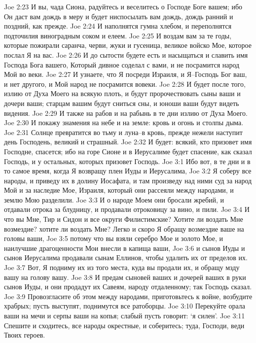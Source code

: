 Joe 2:23  И вы, чада Сиона, радуйтесь и веселитесь о Господе Боге вашем; ибо Он даст вам дождь в меру и будет ниспосылать вам дождь, дождь ранний и поздний, как прежде.
Joe 2:24  И наполнятся гумна хлебом, и переполнятся подточилия виноградным соком и елеем.
Joe 2:25  И воздам вам за те годы, которые пожирали саранча, черви, жуки и гусеница, великое войско Мое, которое послал Я на вас.
Joe 2:26  И до сытости будете есть и насыщаться и славить имя Господа Бога вашего, Который дивное соделал с вами, и не посрамится народ Мой во веки.
Joe 2:27  И узнаете, что Я посреди Израиля, и Я--Господь Бог ваш, и нет другого, и Мой народ не посрамится вовеки.
Joe 2:28  И будет после того, излию от Духа Моего на всякую плоть, и будут пророчествовать сыны ваши и дочери ваши; старцам вашим будут сниться сны, и юноши ваши будут видеть видения.
Joe 2:29  И также на рабов и на рабынь в те дни излию от Духа Моего.
Joe 2:30  И покажу знамения на небе и на земле: кровь и огонь и столпы дыма.
Joe 2:31  Солнце превратится во тьму и луна--в кровь, прежде нежели наступит день Господень, великий и страшный.
Joe 2:32  И будет: всякий, кто призовет имя Господне, спасется; ибо на горе Сионе и в Иерусалиме будет спасение, как сказал Господь, и у остальных, которых призовет Господь.
Joe 3:1  Ибо вот, в те дни и в то самое время, когда Я возвращу плен Иуды и Иерусалима,
Joe 3:2  Я соберу все народы, и приведу их в долину Иосафата, и там произведу над ними суд за народ Мой и за наследие Мое, Израиля, который они рассеяли между народами, и землю Мою разделили.
Joe 3:3  И о народе Моем они бросали жребий, и отдавали отрока за блудницу, и продавали отроковицу за вино, и пили.
Joe 3:4  И что вы Мне, Тир и Сидон и все округи Филистимские? Хотите ли воздать Мне возмездие? хотите ли воздать Мне? Легко и скоро Я обращу возмездие ваше на головы ваши,
Joe 3:5  потому что вы взяли серебро Мое и золото Мое, и наилучшие драгоценности Мои внесли в капища ваши,
Joe 3:6  и сынов Иуды и сынов Иерусалима продавали сынам Еллинов, чтобы удалить их от пределов их.
Joe 3:7  Вот, Я подниму их из того места, куда вы продали их, и обращу мзду вашу на голову вашу.
Joe 3:8  И предам сыновей ваших и дочерей ваших в руки сынов Иуды, и они продадут их Савеям, народу отдаленному; так Господь сказал.
Joe 3:9  Провозгласите об этом между народами, приготовьтесь к войне, возбудите храбрых; пусть выступят, поднимутся все ратоборцы.
Joe 3:10  Перекуйте орала ваши на мечи и серпы ваши на копья; слабый пусть говорит: `я силен'.
Joe 3:11  Спешите и сходитесь, все народы окрестные, и соберитесь; туда, Господи, веди Твоих героев.
